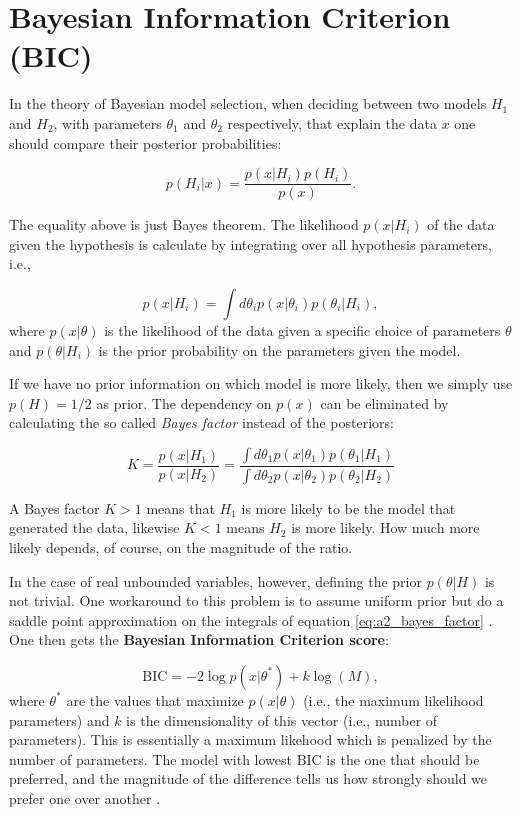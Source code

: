 \section{Bayesian Information Criterion (BIC)}

In the theory of Bayesian model selection, when deciding between two models $H_1$ and $H_2$, with parameters $\theta_1$ and $\theta_2$
respectively, that explain the data $x$ one should compare their
posterior probabilities:

\begin{equation}
  \label{eq:a2_5}
  p(H_i | x) = \frac{p(x | H_i) p(H_i)}{p(x)}.
\end{equation}

The equality above is just Bayes theorem. The likelihood $p(x | H_i)$ of the data given the hypothesis is
calculate by integrating over all hypothesis parameters, i.e.,

\begin{equation}
  \label{eq:a2_7}
  p(x | H_i) = \int d\theta_i p(x | \theta_i) p(\theta_i | H_i),
\end{equation}
where $p(x | \theta)$ is the likelihood of the data given a specific choice of parameters $\theta$ and $p(\theta | H_i)$ is the prior
probability on the parameters given the model.

If we have no prior information on which model is more likely, then we simply
use $p(H) = 1/2$ as prior. The dependency on $p(x)$ can be eliminated by calculating the so called \emph{Bayes factor} instead of the posteriors:

\begin{equation}
  \label{eq:a2_bayes_factor}
  K = \frac{p(x | H_1)}{p(x | H_2)} = \frac{\int d\theta_1 p(x | \theta_1) p(\theta_1 | H_1)}{\int d\theta_2 p(x | \theta_2) p(\theta_2 | H_2)}
\end{equation}

A Bayes factor $K>1$ means that $H_1$ is more likely to be the model
that generated the data, likewise $K<1$ means $H_2$ is more
likely. How much more likely depends, of course, on the magnitude of
the ratio.

In the case of real unbounded variables, however, defining the prior
$p(\theta | H)$ is not trivial. One workaround to this problem is to
assume uniform prior but do a saddle point approximation on the integrals
of equation \eqref{eq:a2_bayes_factor} \cite{BishopBook}. One then gets the \textbf{Bayesian Information Criterion score}:

\begin{equation}
  \label{eq:a2_BIC}
  \text{BIC} = -2\log p(x | \theta^{*}) + k \log(M),
\end{equation}
where $\theta^*$ are the values that maximize $p(x|\theta)$ (i.e., the
maximum likelihood parameters) and $k$ is the dimensionality of this
vector (i.e., number of parameters). This is essentially a maximum
likehood which is penalized by the number of parameters. The model
with lowest BIC is the one that should be preferred, and the magnitude
of the difference tells us how strongly should we prefer one over
another \cite{Kass95}.
